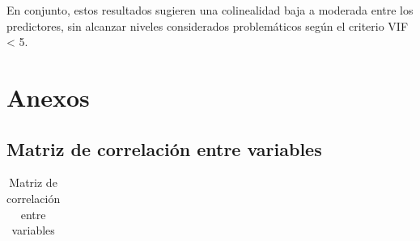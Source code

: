 \documentclass[
  spanish,
  letterpaper,
  DIV=11,
  numbers=noendperiod]{scrartcl}
\begin{document}
En conjunto, estos resultados sugieren una colinealidad baja a moderada
entre los predictores, sin alcanzar niveles considerados problemáticos
según el criterio VIF \textless{} 5.

\clearpage

\section{Anexos}\label{anexos}

\subsection{Matriz de correlación entre
variables}\label{matriz-de-correlaciuxf3n-entre-variables}

{

\begin{longtable}[]{@{}
  >{\raggedright\arraybackslash}p{}
  >{\centering\arraybackslash}p{}
  >{\centering\arraybackslash}p{}
  >{\centering\arraybackslash}p{}
  >{\centering\arraybackslash}p{}
  >{\centering\arraybackslash}p{}
  >{\centering\arraybackslash}p{}
  >{\centering\arraybackslash}p{}
  >{\centering\arraybackslash}p{}
  >{\centering\arraybackslash}p{}
  >{\centering\arraybackslash}p{}@{}}

\caption{\label{tbl-corr-df}Matriz de correlación entre variables}

\tabularnewline


\end{longtable}}
\end{document}
